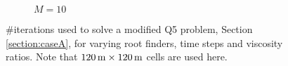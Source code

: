 \begin{figure}[!ht]
\begin{subfigure}[b]{0.49\textwidth}
%
\caption{$M =10$} \label{fig:q5_iterations_perm_h_10_m_10_1_i_180_dt_40to150}
\end{subfigure}%
\caption{\#iterations used to solve a modified Q5 problem, Section \ref{section:caseA}, for varying root finders, time steps and viscosity ratios. Note that $\unit[120]{m} \times \unit[120]{m}$ cells are used here.}
\label{fig:q5_iterations_perm_h_10_i_180}
\end{figure}%
%
